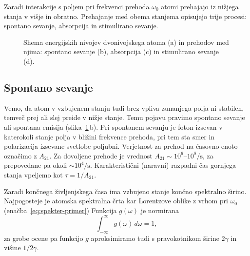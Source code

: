 Zaradi interakcije s poljem pri frekvenci prehoda $\omega_{0}$
atomi prehajajo iz nižjega stanja v višje in obratno. Prehajanje 
med obema stanjema opisujejo trije procesi: 
spontano sevanje, absorpcija in stimulirano sevanje.

\begin{figure}[h]
\centering
\def\svgwidth{140truemm} 

\caption{Shema energijskih nivojev dvonivojskega atoma (a) in prehodov med njima:
spontano sevanje (b), absorpcija (c) in stimulirano sevanje (d).}
\label{sl4.1}
\end{figure}

\subsection*{Spontano sevanje}
Vemo, da atom v vzbujenem stanju tudi brez vpliva zunanjega polja
ni stabilen, temveč prej ali slej preide v nižje stanje. Temu pojavu
pravimo spontano sevanje ali spontana emisija (slika~\ref{sl4.1}\,b). 
Pri spontanem sevanju je foton izsevan v katerokoli stanje polja v bližini 
frekvence prehoda, pri tem sta smer in polarizacija izsevane svetlobe poljubni.
Verjetnost za prehod na časovno enoto označimo z $A_{21}$.
Za dovoljene prehode je vrednost $A_{21} \sim 10^6$--$10^8/\si{\second}$, 
za prepovedane pa okoli $\sim 10^4/\si{\second}$. 
Karakteristični (naravni) razpadni čas gornjega stanja vpeljemo kot
$\tau = 1/A_{21}$. 

Zaradi končnega življenjskega časa ima vzbujeno stanje končno spektralno 
širino. Najpogosteje je atomska spektralna črta kar 
Lorentzove oblike z vrhom pri $\omega_0$
(enačba~\ref{eq:spekter-primer})
Funkcija $g(\omega)$ je normirana
\begin{equation}
\int_{-\infty}^\infty g(\omega)\, d\omega=1,
\label{4.20}
\end{equation}
za grobe ocene pa funkcijo $g$ aproksimiramo tudi s pravokotnikom širine
$2\gamma$ in višine $1/2\gamma$.

